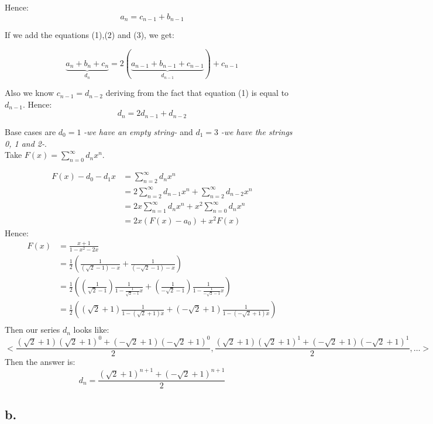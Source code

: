 \documentclass[12pt]{article}
\begin{document}
Hence:
\begin{equation} a_n=c_{n-1}+b_{n-1} \end{equation}

If we add the equations (1),(2) and (3), we get:

\begin{equation*} \underbrace{a_n+b_n+c_n}_{\text{$d_n$}}=2(\underbrace{a_{n-1}+b_{n-1}+c_{n-1}}_{\text{$d_{n-1}$}})+c_{n-1} \end{equation*}

Also we know $c_{n-1}=d_{n-2}$ deriving from the fact that equation (1) is equal to $d_{n-1}$. Hence:
\begin{equation} d_n=2d_{n-1}+d_{n-2}\end{equation}

Base cases are $d_0=1$ \textit{-we have an empty string-} and $d_1=3$ \textit{-we have the strings 0, 1 and 2-}.\\

Take $F(x)=\sum_{n=0}^{\infty}d_n x^n$.

\begin{align*}
F(x)-d_0-d_1 x &= \sum_{n=2}^{\infty}d_n x^n\\
		   	   &= 2\sum_{n=2}^{\infty}d_{n-1} x^n + \sum_{n=2}^{\infty}d_{n-2} x^n\\
 	           &= 2x\sum_{n=1}^{\infty}d_n x^n+x^2 \sum_{n=0}^{\infty}d_n x^n\\
			   &= 2x(F(x)-a_0)+x^2 F(x)
\end{align*}
Hence:
\begin{align*}
F(x) &= \frac{x+1}{1-x^2-2x}\\
	 &= \frac{1}{2}\left(\frac{1}{(\sqrt{2}-1)-x} + \frac{1}{(-\sqrt{2}-1)-x}\right)\\
	 &= \frac{1}{2}\left(\left(\frac{1}{\sqrt{2}-1}\right)\frac{1}{1-\frac{1}{\sqrt{2}-1}x} + \left(\frac{1}{-\sqrt{2}-1}\right)\frac{1}{1-\frac{1}{-\sqrt{2}-1}x}\right)\\
	 &= \frac{1}{2}\left((\sqrt{2}+1)\frac{1}{1-(\sqrt{2}+1)x} + (-\sqrt{2}+1)\frac{1}{1-(-\sqrt{2}+1)x}\right)\\
\end{align*}
Then our series $d_n$ looks like: $$<\frac{(\sqrt{2}+1)(\sqrt{2}+1)^0+(-\sqrt{2}+1)(-\sqrt{2}+1)^0}{2},\frac{(\sqrt{2}+1)(\sqrt{2}+1)^1+(-\sqrt{2}+1)(-\sqrt{2}+1)^1}{2},\dots>$$
Then the answer is: $$d_n=\frac{(\sqrt{2}+1)^{n+1}+(-\sqrt{2}+1)^{n+1}}{2}$$

\subsection*{b.}
\end{document}
